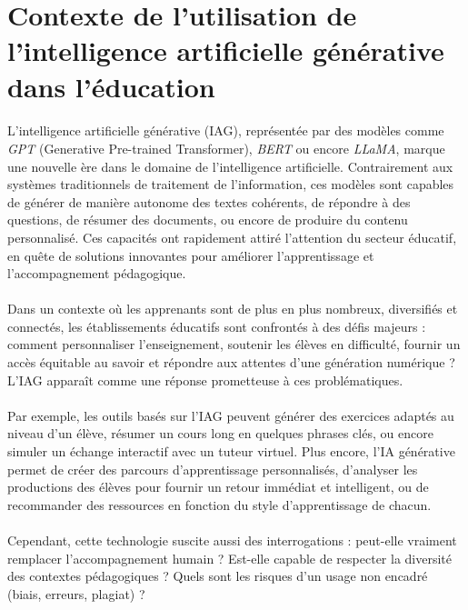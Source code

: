 \section*{Contexte de l’utilisation de l’intelligence artificielle générative dans l’éducation}

\paragraph{}
L’intelligence artificielle générative (IAG), représentée par des modèles comme \textit{GPT} (Generative Pre-trained Transformer), \textit{BERT} ou encore \textit{LLaMA}, marque une nouvelle ère dans le domaine de l’intelligence artificielle. Contrairement aux systèmes traditionnels de traitement de l’information, ces modèles sont capables de générer de manière autonome des textes cohérents, de répondre à des questions, de résumer des documents, ou encore de produire du contenu personnalisé. Ces capacités ont rapidement attiré l’attention du secteur éducatif, en quête de solutions innovantes pour améliorer l’apprentissage et l’accompagnement pédagogique.

\paragraph{}
Dans un contexte où les apprenants sont de plus en plus nombreux, diversifiés et connectés, les établissements éducatifs sont confrontés à des défis majeurs : comment personnaliser l’enseignement, soutenir les élèves en difficulté, fournir un accès équitable au savoir et répondre aux attentes d’une génération numérique ? L’IAG apparaît comme une réponse prometteuse à ces problématiques.

\paragraph{}
Par exemple, les outils basés sur l’IAG peuvent générer des exercices adaptés au niveau d’un élève, résumer un cours long en quelques phrases clés, ou encore simuler un échange interactif avec un tuteur virtuel. Plus encore, l’IA générative permet de créer des parcours d’apprentissage personnalisés, d’analyser les productions des élèves pour fournir un retour immédiat et intelligent, ou de recommander des ressources en fonction du style d’apprentissage de chacun.

\paragraph{}
Cependant, cette technologie suscite aussi des interrogations : peut-elle vraiment remplacer l’accompagnement humain ? Est-elle capable de respecter la diversité des contextes pédagogiques ? Quels sont les risques d’un usage non encadré (biais, erreurs, plagiat) ?


